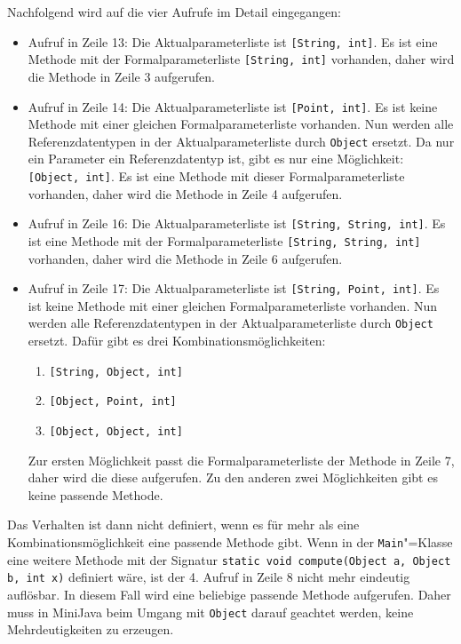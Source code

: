 Nachfolgend wird auf die vier Aufrufe im Detail eingegangen:
\begin{itemize}
    \item Aufruf in Zeile 13: Die Aktualparameterliste ist \lstinline{[String, int]}. Es ist eine Methode mit der Formalparameterliste \lstinline{[String, int]} vorhanden, daher wird die Methode in Zeile 3 aufgerufen.
    \item Aufruf in Zeile 14: Die Aktualparameterliste ist \lstinline{[Point, int]}. Es ist keine Methode mit einer gleichen Formalparameterliste vorhanden. Nun werden alle Referenzdatentypen in der Aktualparameterliste durch \lstinline{Object} ersetzt. Da nur ein Parameter ein Referenzdatentyp ist, gibt es nur eine Möglichkeit: \lstinline{[Object, int]}. Es ist eine Methode mit dieser Formalparameterliste vorhanden, daher wird die Methode in Zeile 4 aufgerufen.
    \item Aufruf in Zeile 16: Die Aktualparameterliste ist \lstinline{[String, String, int]}. Es ist eine Methode mit der Formalparameterliste \lstinline{[String, String, int]} vorhanden, daher wird die Methode in Zeile 6 aufgerufen.
    \item Aufruf in Zeile 17: Die Aktualparameterliste ist \lstinline{[String, Point, int]}. Es ist keine Methode mit einer gleichen Formalparameterliste vorhanden. Nun werden alle Referenzdatentypen in der Aktualparameterliste durch \lstinline{Object} ersetzt. Dafür gibt es drei Kombinationsmöglichkeiten:
    \begin{enumerate}
        \item \lstinline{[String, Object, int]}
        \item \lstinline{[Object, Point, int]}
        \item \lstinline{[Object, Object, int]}
    \end{enumerate}
    Zur ersten Möglichkeit passt die Formalparameterliste der Methode in Zeile 7, daher wird die diese aufgerufen. Zu den anderen zwei Möglichkeiten gibt es keine passende Methode.
\end{itemize}

\pagebreak
Das Verhalten ist dann nicht definiert, wenn es für mehr als eine Kombinationsmöglichkeit eine passende Methode gibt. Wenn in der \lstinline{Main}"=Klasse eine weitere Methode mit der Signatur \lstinline{static void compute(Object a, Object b, int x)} definiert wäre, ist der 4. Aufruf in Zeile 8 nicht mehr eindeutig auflösbar. In diesem Fall wird eine beliebige passende Methode aufgerufen. Daher muss in MiniJava beim Umgang mit \lstinline{Object} darauf geachtet werden, keine Mehrdeutigkeiten zu erzeugen.

